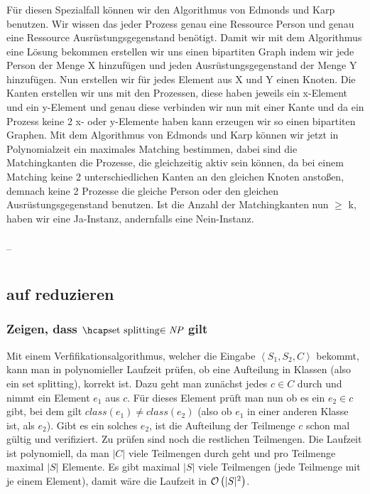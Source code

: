 \documentclass[a4paper]{article}
\begin{document}
		\subsubsection{}
		Für diesen Spezialfall können wir den Algorithmus von Edmonds und Karp benutzen.
		Wir wissen das jeder Prozess genau eine Ressource \glqq Person \grqq und genau eine Ressource \glqq Ausrüstungsgegenstand \grqq benötigt.
		 Damit wir mit dem Algorithmus eine Lösung bekommen erstellen wir uns einen bipartiten Graph indem wir jede \glqq Person \grqq der Menge X hinzufügen und jeden \glqq Ausrüstungsgegenstand \grqq der Menge Y hinzufügen.
		 Nun erstellen wir für jedes Element aus X und Y einen Knoten.
		 Die Kanten erstellen wir uns mit den Prozessen, diese haben jeweils ein x-Element und ein y-Element und genau diese verbinden wir nun mit einer Kante und da ein Prozess keine 2 x- oder y-Elemente haben kann erzeugen wir so einen bipartiten Graphen.
		 Mit dem Algorithmus von Edmonds und Karp können wir jetzt in Polynomialzeit ein maximales Matching bestimmen, dabei sind die Matchingkanten die Prozesse, die gleichzeitig aktiv sein können, da bei einem Matching keine 2 unterschiedlichen Kanten an den gleichen Knoten anstoßen, demnach keine 2 Prozesse die gleiche \glqq Person \grqq oder den gleichen \glqq Ausrüstungsgegenstand \grqq benutzen.
		 Ist die Anzahl der Matchingkanten nun $\geq$ k, haben wir eine Ja-Instanz, andernfalls eine Nein-Instanz.
		\subsubsection{}
		--
	\section{}
		\subsection{\threesat auf \setsplit reduzieren}
			\subsubsection{Zeigen, dass $\setsplit\in\np$ gilt}
			Mit einem Verfifikationsalgorithmus, welcher die Eingabe $\left\langle S_1, S_2, C \right\rangle$ bekommt, kann man in polynomieller Laufzeit prüfen, ob eine Aufteilung in Klassen (also ein set splitting), korrekt ist.\n
			Dazu geht man zunächst jedes $c\in C$ durch und nimmt ein Element $e_1$ aus $c$.
			Für dieses Element prüft man nun ob es ein $e_2\in c$ gibt, bei dem gilt $class(e_1)\neq class(e_2)$ (also ob $e_1$ in einer anderen Klasse ist, als $e_2$).
			Gibt es ein solches $e_2$, ist die Aufteilung der Teilmenge $c$ schon mal gültig und verifiziert.
			Zu prüfen sind noch die restlichen Teilmengen.\n
			Die Laufzeit ist polynomiell, da man $|C|$ viele Teilmengen durch geht und pro Teilmenge maximal $|S|$ Elemente. Es gibt maximal $|S|$ viele Teilmengen (jede Teilmenge mit je einem Element), damit wäre die Laufzeit in $\mathcal{O}\left(|S|^2\right)$.
\end{document}
